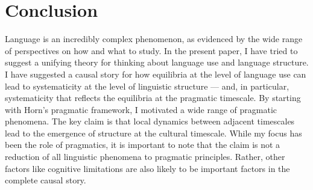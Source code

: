 \documentclass[man, noapacite, 12pt]{apa2}
\begin{document}






\section{Conclusion} 
Language is an incredibly complex phenomenon, as evidenced by the wide range of perspectives on how and what to study. In the present paper, I have tried to suggest a unifying theory for thinking about language use and language structure. I have suggested a causal story for how  equilibria at the level of language use can lead to systematicity at the level of linguistic structure --- and, in particular, systematicity that reflects the equilibria at the pragmatic timescale. By starting with Horn's pragmatic framework, I  motivated a wide range of pragmatic phenomena. The key claim is that local dynamics between adjacent timescales lead to the emergence of structure at the cultural timescale. While my focus has been the role of pragmatics, it is important to note that  the claim is not a reduction of all linguistic phenomena to pragmatic principles. Rather, other factors like cognitive limitations are also likely to be important factors in the complete causal story.
\end{document}
